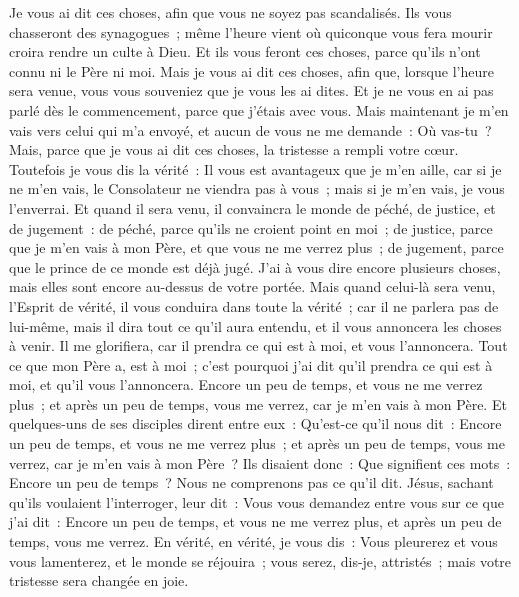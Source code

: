 \begin{multicols}{2}
\VerseOne{}Je vous ai dit ces choses, afin que vous ne soyez pas scandalisés.
Ils vous chasseront des synagogues~; même l'heure vient où quiconque vous fera mourir croira rendre un culte à Dieu.
Et ils vous feront ces choses, parce qu'ils n'ont connu ni le Père ni moi.
Mais je vous ai dit ces choses, afin que, lorsque l'heure sera venue, vous vous souveniez que je vous les ai dites. Et je ne vous en ai pas parlé dès le commencement, parce que j'étais avec vous.
Mais maintenant je m'en vais vers celui qui m'a envoyé, et aucun de vous ne me demande~: Où vas-tu~?
Mais, parce que je vous ai dit ces choses, la tristesse a rempli votre cœur.
Toutefois je vous dis la vérité~: Il vous est avantageux que je m'en aille, car si je ne m'en vais, le Consolateur ne viendra pas à vous~; mais si je m'en vais, je vous l'enverrai.
Et quand il sera venu, il convaincra le monde de péché, de justice, et de jugement~:
de péché, parce qu'ils ne croient point en moi~;
de justice, parce que je m'en vais à mon Père, et que vous ne me verrez plus~;
de jugement, parce que le prince de ce monde est déjà jugé.
 J'ai à vous dire encore plusieurs choses, mais elles sont encore au-dessus de votre portée.
Mais quand celui-là sera venu, l'Esprit de vérité, il vous conduira dans toute la vérité~; car il ne parlera pas de lui-même, mais il dira tout ce qu'il aura entendu, et il vous annoncera les choses à venir.
Il me glorifiera, car il prendra ce qui est à moi, et vous l'annoncera.
Tout ce que mon Père a, est à moi~; c'est pourquoi j'ai dit qu'il prendra ce qui est à moi, et qu'il vous l'annoncera.
Encore un peu de temps, et vous ne me verrez plus~; et après un peu de temps, vous me verrez, car je m'en vais à mon Père.
Et quelques-uns de ses disciples dirent entre eux~: Qu'est-ce qu'il nous dit~: Encore un peu de temps, et vous ne me verrez plus~; et après un peu de temps, vous me verrez, car je m'en vais à mon Père~?
Ils disaient donc~: Que signifient ces mots~: Encore un peu de temps~? Nous ne comprenons pas ce qu'il dit.
Jésus, sachant qu'ils voulaient l'interroger, leur dit~: Vous vous demandez entre vous sur ce que j'ai dit~: Encore un peu de temps, et vous ne me verrez plus, et après un peu de temps, vous me verrez.
En vérité, en vérité, je vous dis~: Vous pleurerez et vous vous lamenterez, et le monde se réjouira~; vous serez, dis-je, attristés~; mais votre tristesse sera changée en joie.

\end{multicols}
